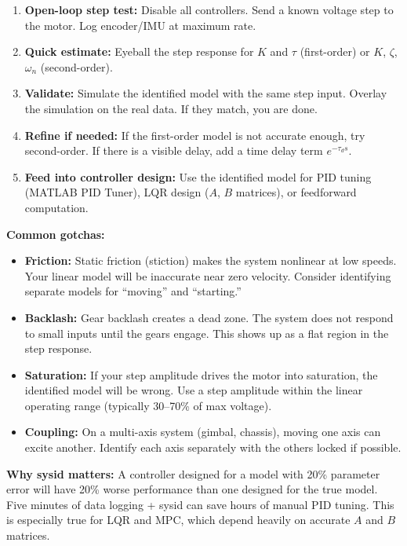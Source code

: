 \begin{enumerate}
    \item \textbf{Open-loop step test:} Disable all controllers. Send a known voltage step to the motor. Log encoder/IMU at maximum rate.
    \item \textbf{Quick estimate:} Eyeball the step response for $K$ and $\tau$ (first-order) or $K$, $\zeta$, $\omega_n$ (second-order).
    \item \textbf{Validate:} Simulate the identified model with the same step input. Overlay the simulation on the real data. If they match, you are done.
    \item \textbf{Refine if needed:} If the first-order model is not accurate enough, try second-order. If there is a visible delay, add a time delay term $e^{-\tau_d s}$.
    \item \textbf{Feed into controller design:} Use the identified model for PID tuning (MATLAB PID Tuner), LQR design ($A$, $B$ matrices), or feedforward computation.
\end{enumerate}

\textbf{Common gotchas:}
\begin{itemize}
    \item \textbf{Friction:} Static friction (stiction) makes the system nonlinear at low speeds. Your linear model will be inaccurate near zero velocity. Consider identifying separate models for ``moving'' and ``starting.''
    \item \textbf{Backlash:} Gear backlash creates a dead zone. The system does not respond to small inputs until the gears engage. This shows up as a flat region in the step response.
    \item \textbf{Saturation:} If your step amplitude drives the motor into saturation, the identified model will be wrong. Use a step amplitude within the linear operating range (typically 30--70\% of max voltage).
    \item \textbf{Coupling:} On a multi-axis system (gimbal, chassis), moving one axis can excite another. Identify each axis separately with the others locked if possible.
\end{itemize}

\textbf{Why sysid matters:} A controller designed for a model with 20\% parameter error will have 20\% worse performance than one designed for the true model. Five minutes of data logging + sysid can save hours of manual PID tuning. This is especially true for LQR and MPC, which depend heavily on accurate $A$ and $B$ matrices.

